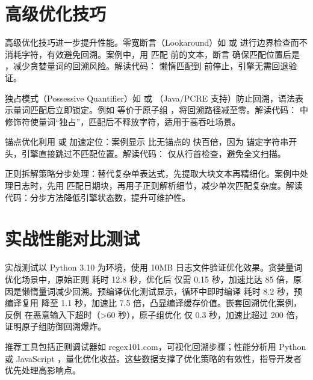 \chapter{高级优化技巧}
高级优化技巧进一步提升性能。零宽断言（Lookaround）如  或  进行边界检查而不消耗字符，有效避免回溯。案例中，用  匹配  前的文本，断言  确保匹配位置后是 ，减少贪婪量词的回溯风险。解读代码： 懒惰匹配到  前停止，引擎无需回退验证。\par
独占模式（Possessive Quantifier）如  或 （Java/PCRE 支持）防止回溯，语法表示量词匹配后立即锁定。例如  等价于原子组 ，将回溯路径减至零。解读代码： 中 \InlineCode{+} 修饰符使量词“独占”，匹配后不释放字符，适用于高吞吐场景。\par
锚点优化利用 \InlineCode{\^{}} 或 \InlineCode{\${}} 加速定位：案例显示  比无锚点的  快百倍，因为 \InlineCode{\^{}} 锚定字符串开头，引擎直接跳过不匹配位置。解读代码： 仅从行首检查，避免全文扫描。\par
正则拆解策略分步处理：替代复杂单表达式，先提取大块文本再精细化。案例中处理日志时，先用  匹配日期块，再用子正则解析细节，减少单次匹配复杂度。解读代码：分步方法降低引擎状态数，提升可维护性。\par
\chapter{实战性能对比测试}
实战测试以 Python 3.10 为环境，使用 10MB 日志文件验证优化效果。贪婪量词优化场景中，原始正则  耗时 12.8 秒，优化后  仅需 0.15 秒，加速比达 85 倍，原因是懒惰量词减少回溯。预编译优化测试显示，循环中即时编译  耗时 8.2 秒，预编译复用  降至 1.1 秒，加速比 7.5 倍，凸显编译缓存价值。嵌套回溯优化案例，反例  在恶意输入下超时（>60 秒），原子组优化  仅 0.3 秒，加速比超过 200 倍，证明原子组防御回溯爆炸。\par
推荐工具包括正则调试器如 regex101.com，可视化回溯步骤；性能分析用 Python  或 JavaScript ，量化优化收益。这些数据支撑了优化策略的有效性，指导开发者优先处理高影响点。\par
